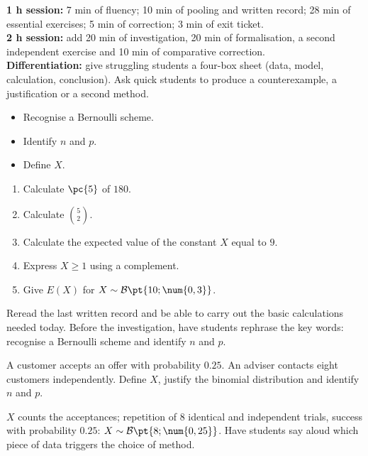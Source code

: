 \ifmxteacher
\begin{method}
\textbf{1 h session:} 7 min of fluency; 10 min of pooling and written record; 28 min of essential exercises; 5 min of correction; 3 min of exit ticket.\\
\textbf{2 h session:} add 20 min of investigation, 20 min of formalisation, a second independent exercise and 10 min of comparative correction.\\
\textbf{Differentiation:} give struggling students a four-box sheet (data, model, calculation, conclusion). Ask quick students to produce a counterexample, a justification or a second method.
\end{method}
\fi
{}
\begin{objectives}\begin{itemize}\item Recognise a Bernoulli scheme.\item Identify $n$ and $p$.\item Define $X$.\end{itemize}\end{objectives}
\begin{fluency}\begin{enumerate}\item Calculate $\pc{5}$ of $180$. \item Calculate $\binom52$. \item Calculate the expected value of the constant $X$ equal to $9$. \item Express $X\geq1$ using a complement. \item Give $E(X)$ for $X\sim\mathcal B\pt{10;\num{0,3}}$. \end{enumerate}\end{fluency}
\begin{prerequisites}Reread the last written record and be able to carry out the basic calculations needed today. Before the investigation, have students rephrase the key words: recognise a Bernoulli scheme and identify $n$ and $p$.\end{prerequisites}

\begin{activity}
A customer accepts an offer with probability $\num{0,25}$. An adviser contacts eight customers independently. Define $X$, justify the binomial distribution and identify $n$ and $p$.

\end{activity}
\begin{solution}$X$ counts the acceptances; repetition of 8 identical and independent trials, success with probability $\num{0,25}$: $X\sim\mathcal B\pt{8;\num{0,25}}$. Have students say aloud which piece of data triggers the choice of method.\end{solution}

